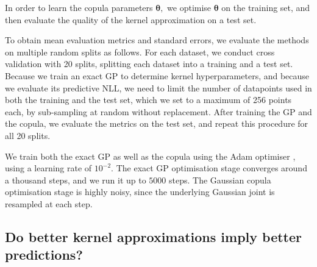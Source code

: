 In order to learn the copula parameters $\boldsymbol{\theta},$ we optimise $\boldsymbol{\theta}$ on the training set, and then evaluate the quality of the kernel approximation on a test set.

To obtain mean evaluation metrics and standard errors, we evaluate the methods on multiple random splits as follows.
For each dataset, we conduct cross validation with 20 splits, splitting each dataset into a training and a test set.
Because we train an exact GP to determine kernel hyperparameters, and because we evaluate its predictive NLL, we need to limit the number of datapoints used in both the training and the test set, which we set to a maximum of 256 points each, by sub-sampling at random without replacement.
After training the GP and the copula, we evaluate the metrics on the test set, and repeat this procedure for all 20 splits.

We train both the exact GP as well as the copula using the Adam optimiser \citep{kingma2014adam}, using a learning rate of $10^{-2}.$
The exact GP optimisation stage converges around a thousand steps, and we run it up to $5000$ steps.
The Gaussian copula optimisation stage is highly noisy, since the underlying Gaussian joint is resampled at each step.

\subsection{Do better kernel approximations imply better predictions?}

